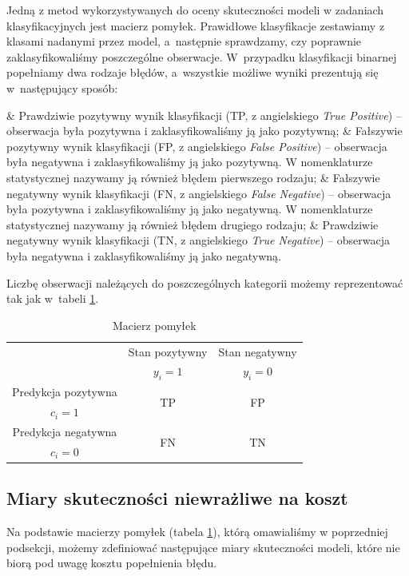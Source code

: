 \documentclass[inzynierska]{pwr_wmat_praca_dyplomowa}
\theoremstyle{plain}
\numberwithin{theorem}{chapter}
\theoremstyle{definition}
\numberwithin{theorem}{chapter}
\begin{document}
Jedną z metod wykorzystywanych do oceny skuteczności modeli w zadaniach klasyfikacyjnych jest macierz pomyłek. Prawidłowe klasyfikacje zestawiamy z klasami nadanymi przez model, a~następnie sprawdzamy, czy poprawnie zaklasyfikowaliśmy poszczególne obserwacje. W~przypadku klasyfikacji binarnej popełniamy dwa rodzaje błędów, a~wszystkie możliwe wyniki prezentują się w~następujący sposób:
\begin{myitemize}
	& Prawdziwie pozytywny wynik klasyfikacji (TP, z angielskiego \textit{True Positive}) -- obserwacja była pozytywna i zaklasyfikowaliśmy ją jako pozytywną;
	& Fałszywie pozytywny wynik klasyfikacji (FP, z angielskiego \textit{False Positive}) -- obserwacja była negatywna i zaklasyfikowaliśmy ją jako pozytywną. W nomenklaturze statystycznej nazywamy ją również błędem pierwszego rodzaju;
	& Fałszywie negatywny wynik klasyfikacji (FN, z angielskiego \textit{False Negative}) -- obserwacja była pozytywna i zaklasyfikowaliśmy ją jako negatywną. W nomenklaturze statystycznej nazywamy ją również błędem drugiego rodzaju;
	& Prawdziwie negatywny wynik klasyfikacji (TN, z angielskiego \textit{True Negative}) -- obserwacja była negatywna i zaklasyfikowaliśmy ją jako negatywną.
\end{myitemize}
\noindent Liczbę obserwacji należących do poszczególnych kategorii możemy reprezentować tak jak w~tabeli \ref{tab:macierz-pomylek}.
\begin{table}[h]
	\begin{center}
		\begin{tabular}{c|c|c}
			 \multirow{2}{4em}{} & Stan pozytywny & Stan negatywny \\
			                  & $y_i = 1$            & $y_i = 0$ \\
			 \hline
			  Predykcja pozytywna & \multirow{2}{4em}{\centering TP} & \multirow{2}{4em}{\centering FP} \\
			    $c_i = 1$         &                    &                    \\
			 \hline
			 Predykcja negatywna & \multirow{2}{4em}{\centering FN} & \multirow{2}{4em}{\centering TN} \\
			   $c_i = 0$         &                    &                    \\
		\end{tabular}
	\end{center}
	\caption{Macierz pomyłek}
	\label{tab:macierz-pomylek}
\end{table}

\subsection{Miary skuteczności niewrażliwe na koszt}
Na podstawie macierzy pomyłek (tabela \ref{tab:macierz-pomylek}), którą omawialiśmy w poprzedniej podsekcji, możemy zdefiniować następujące miary skuteczności modeli, które nie biorą pod uwagę kosztu popełnienia błędu.
\end{document}
